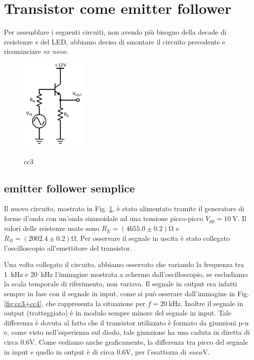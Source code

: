 \section{Transistor come emitter follower}

Per assemblare i seguenti circuiti, non avendo più bisogno della decade di resistenze e del LED, abbiamo deciso di smontare il circuito precedente e ricominciare \emph{ex novo}.

\begin{figure}
	\caption{cc3}
	\includegraphics[height=45mm]{cc3.pdf}
	\label{fig:cc3}
\end{figure}

\subsection{emitter follower semplice}
Il nuovo circuito, mostrato in Fig. \ref{fig:cc3}, è stato alimentato tramite il generatore di forme d'onda con un'onda sinusoidale ad una tensione picco-picco $V_{pp} = \SI{10}{\volt}$.
Il valori delle reistenze usate sono $R_E = (4655.0 \pm 0.2)\si{\ohm}$ e $R_B = (2002.4 \pm 0.2)\si{\ohm}$.
Per osservare il segnale in uscita è stato collegato l'oscilloscopio all'emettitore del transistor.

Una volta collegato il circuito, abbiamo osservato che variando la frequenza tra \SI{1}{\kilo\hertz} e \SI{20}{\kilo\hertz} l'immagine mostrata a schermo dall'oscilloscopio, se escludiamo la scala temporale di riferimento, non variava.
Il segnale in output era infatti sempre in fase con il segnale in input, come si può osserare dall'immagine in Fig. \ref{fig:cc3+cc4}, che rappresenta la situazione per $f = \SI{20}{\kilo\hertz}$.
Inoltre il segnale in output (tratteggiato) è in modulo sempre minore del segnale in input.
Tale differenza è dovuta al fatto che il transistor utilizzato è formato da giunzioni p-n e, come visto nell'esperienza sul diodo, tale giunzione ha una caduta in diretta di circa $0.6\si{\volt}$. Come vediamo anche graficamente, la differenza tra picco del segnale in input e quello in output è di circa $0.6\si{\volt}$, per l'esattezza di $suca\si{\volt}$.

